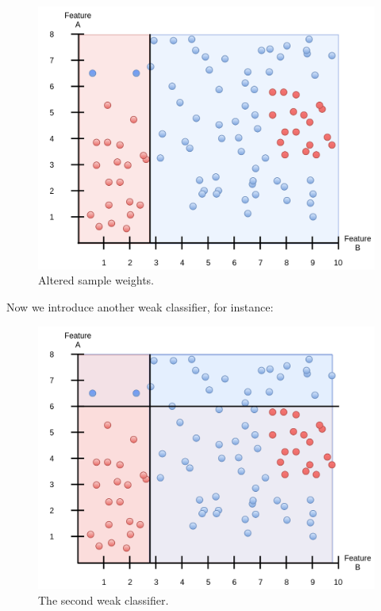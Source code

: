 \documentclass[a4paper, 12pt]{article}
\begin{document}
                    \begin{figure}[h]
                            \caption{Altered sample weights.}
                            \centering
                            \includegraphics[width=\textwidth]{boosting2}
                    \end{figure} 
                    
                    \newpage
                    
                    \par Now we introduce another weak classifier, for instance:
                    
                    \begin{figure}[h]
                            \caption{The second weak classifier.}
                            \centering
                            \includegraphics[width=\textwidth]{boosting3}
                    \end{figure} 
                    
\end{document}

